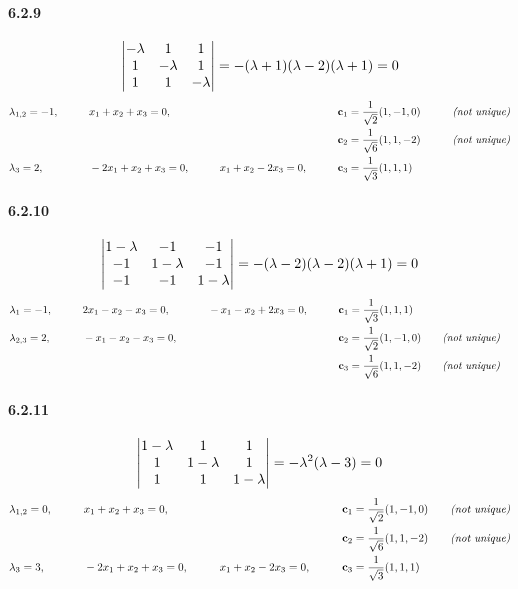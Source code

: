 \documentclass[a4paper]{article}
\begin{document}
\paragraph{6.2.9}
\[
\begin{vmatrix}
 -\lambda&1&1 \\
1 & -\lambda& 1\\
1 & 1& -\lambda
\end{vmatrix}=
-(\lambda+1)(\lambda-2)(\lambda+1)=0
\]
\begin{alignat*}{5}
    & \lambda_{1,2}=-1 ,\qquad && x_1+x_2+x_3=0,\qquad && \qquad && \mathbf{c}_1=\frac{1}{\sqrt{2}}(1,-1,0)\quad &&\textit{(not unique)}\\
    & \qquad && \qquad && \qquad && \mathbf{c}_2=\frac{1}{\sqrt{6}}(1,1,-2)\qquad &&\textit{(not unique)}\\
    & \lambda_3=2 ,\qquad && -2x_1+x_2+x_3=0,\qquad && x_1+x_2-2x_3=0,\qquad && \mathbf{c}_3=\frac{1}{\sqrt{3}}(1,1,1) \\
\end{alignat*}

\paragraph{6.2.10}
\[
\begin{vmatrix}
 1-\lambda&-1 &-1 \\
 -1& 1-\lambda& -1\\
 -1&-1 & 1-\lambda
\end{vmatrix}=
-(\lambda-2)(\lambda-2)(\lambda+1)=0
\]
\begin{alignat*}{5}
    & \lambda_1=-1 ,\qquad && 2x_1-x_2-x_3=0,\qquad && -x_1-x_2+2x_3=0,\qquad && \mathbf{c}_1=\frac{1}{\sqrt{3}}(1,1,1)\\
    & \lambda_{2,3}=2 ,\qquad && -x_1-x_2-x_3=0,\qquad && \qquad && \mathbf{c}_2=\frac{1}{\sqrt{2}}(1,-1,0)  \quad &&\textit{(not unique)}\\
    &  \qquad && \qquad && \qquad && \mathbf{c}_3=  \frac{1}{\sqrt{6}}(1,1,-2)\quad &&\textit{(not unique)}\\
\end{alignat*}

\paragraph{6.2.11}
\[
\begin{vmatrix}
 1-\lambda&1 &1 \\
 1& 1-\lambda&1 \\
 1& 1& 1-\lambda
\end{vmatrix}=
-\lambda^2(\lambda-3)=0
\]
\begin{alignat*}{5}
    & \lambda_{1,2}=0 ,\qquad && x_1+x_2+x_3=0,\qquad && \qquad && \mathbf{c}_1=\frac{1}{\sqrt{2}}(1,-1,0)  \quad &&\textit{(not unique)}\\
    &  \qquad && \qquad && \qquad && \mathbf{c}_2=\frac{1}{\sqrt{6}}(1,1,-2)  \quad &&\textit{(not unique)}\\
    & \lambda_3=3 ,\qquad && -2x_1+x_2+x_3=0,\qquad && x_1+x_2-2x_3=0,\qquad && \mathbf{c}_3=\frac{1}{\sqrt{3}}(1,1,1)\\
\end{alignat*}
\end{document}
